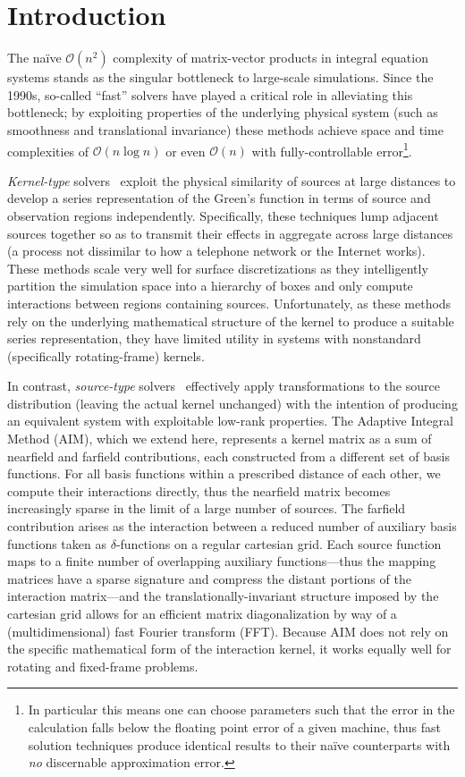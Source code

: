 \section{Introduction}

The na\"ive $\mathcal{O}(n^2)$ complexity of matrix-vector products in integral equation systems stands as the singular bottleneck to large-scale simulations.
Since the 1990s, so-called ``fast'' solvers have played a critical role in alleviating this bottleneck; by exploiting properties of the underlying physical system (such as smoothness and translational invariance) these methods achieve space and time complexities of $\mathcal{O}(n \log n)$ or even $\mathcal{O}(n)$ with fully-controllable error\footnote{In particular this means one can choose parameters such that the error in the calculation falls below the floating point error of a given machine, thus fast solution techniques produce identical results to their na\"ive counterparts with \emph{no} discernable approximation error.}.

\emph{Kernel-type} solvers~\cite{Greengard1987,PWTD} exploit the physical similarity of sources at large distances to develop a series representation of the Green's function in terms of source and observation regions independently.
Specifically, these techniques lump adjacent sources together so as to transmit their effects in aggregate across large distances (a process not dissimilar to how a telephone network or the Internet works).
These methods scale very well for surface discretizations as they intelligently partition the simulation space into a hierarchy of boxes and only compute interactions between regions containing sources.
Unfortunately, as these methods rely on the underlying mathematical structure of the kernel to produce a suitable series representation, they have limited utility in systems with nonstandard (specifically rotating-frame) kernels.

In contrast, \emph{source-type} solvers~\cite{Bleszynski1996,Yilmaz2004,Kapur1997} effectively apply transformations to the source distribution (leaving the actual kernel unchanged) with the intention of producing an equivalent system with exploitable low-rank properties.
The Adaptive Integral Method (AIM), which we extend here, represents a kernel matrix as a sum of nearfield and farfield contributions, each constructed from a different set of basis functions.
For all basis functions within a prescribed distance of each other, we compute their interactions directly, thus the nearfield matrix becomes increasingly sparse in the limit of a large number of sources.
The farfield contribution arises as the interaction between a reduced number of auxiliary basis functions taken as $\delta$-functions on a regular cartesian grid.
Each source function maps to a finite number of overlapping auxiliary functions---thus the mapping matrices have a sparse signature and compress the distant portions of the interaction matrix---and the translationally-invariant structure imposed by the cartesian grid allows for an efficient matrix diagonalization by way of a (multidimensional) fast Fourier transform (FFT).
Because AIM does not rely on the specific mathematical form of the interaction kernel, it works equally well for rotating and fixed-frame problems.

